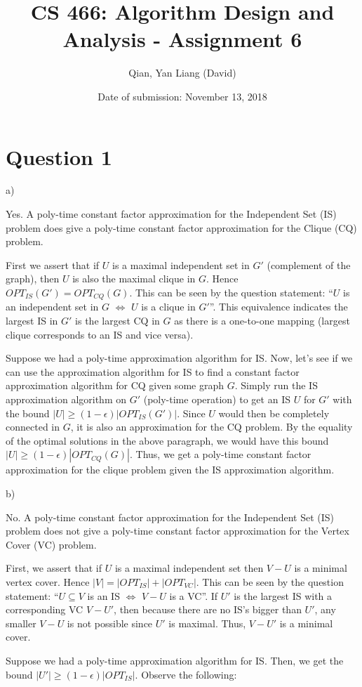 \documentclass{article}
\title{CS 466: Algorithm Design and Analysis - Assignment 6}
\author{Qian, Yan Liang (David)}
\date{Date of submission: November 13, 2018}
\begin{document}
\newpage

\section{Question 1}

a)

Yes. A poly-time constant factor approximation for the Independent Set (IS) problem does give a poly-time constant
factor approximation for the Clique (CQ) problem.

First we assert that if $U$ is a maximal independent set in $G'$ (complement of the graph), then $U$ is also the maximal
clique in $G$. Hence $OPT_{IS}(G') = OPT_{CQ}(G)$. This can be seen by the question statement: ``$U$ is an independent
set in $G$ $\iff$ $U$ is a clique in $G'$''. This equivalence indicates the largest IS in $G'$ is the largest CQ in $G$
as there is a one-to-one mapping (largest clique corresponds to an IS and vice versa).

Suppose we had a poly-time approximation algorithm for IS. Now, let's see if we can use the approximation algorithm for
IS to find a constant factor approximation algorithm for CQ given some graph $G$. Simply run the IS approximation
algorithm on $G'$ (poly-time operation) to get an IS $U$ for $G'$ with the bound $|U| \geq (1 -
\epsilon)|OPT_{IS}(G')|$. Since $U$ would then be completely connected in $G$, it is also an approximation for the CQ
problem. By the equality of the optimal solutions in the above paragraph, we would have this bound $|U| \geq (1 -
\epsilon)|OPT_{CQ}(G)|$. Thus, we get a poly-time constant factor approximation for the clique problem given the IS
approximation algorithm.


b)

No. A poly-time constant factor approximation for the Independent Set (IS) problem does not give a poly-time constant
factor approximation for the Vertex Cover (VC) problem.

First, we assert that if $U$ is a maximal independent set then $V - U$ is a minimal vertex cover. Hence $|V| =
|OPT_{IS}| + |OPT_{VC}|$. This can be seen by the question statement: ``$U \subseteq V$ is an IS $\iff$ $V-U$ is a VC''.
If $U'$ is the largest IS with a corresponding VC $V - U'$, then because there are no IS's bigger than $U'$, any smaller
$V - U$ is not possible since $U'$ is maximal. Thus, $V - U'$ is a minimal cover.

Suppose we had a poly-time approximation algorithm for IS. Then, we get the bound $|U'| \geq (1 - \epsilon)|OPT_{IS}|$.
Observe the following:
\end{document}
